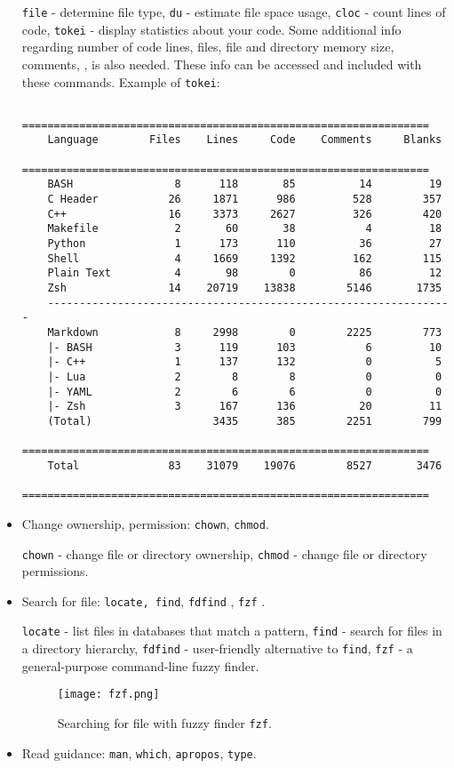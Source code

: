 \begin{itemize}
	\verb|file| - determine file type, \verb|du| - estimate file space usage, \verb|cloc| - count lines of code, \verb|tokei| - display statistics about your code. Some additional info regarding number of code lines, files, file and directory memory size, comments, \etc, is also needed. These info can be accessed and included with these commands. Example of \texttt{tokei}:
	\begin{verbatim}
	================================================================
	Language        Files    Lines     Code    Comments     Blanks
	================================================================
	BASH                8      118       85          14         19
	C Header           26     1871      986         528        357
	C++                16     3373     2627         326        420
	Makefile            2       60       38           4         18
	Python              1      173      110          36         27
	Shell               4     1669     1392         162        115
	Plain Text          4       98        0          86         12
	Zsh                14    20719    13838        5146       1735
	----------------------------------------------------------------
	Markdown            8     2998        0        2225        773
	|- BASH             3      119      103           6         10
	|- C++              1      137      132           0          5
	|- Lua              2        8        8           0          0
	|- YAML             2        6        6           0          0
	|- Zsh              3      167      136          20         11
	(Total)                   3435      385        2251        799
	================================================================
	Total              83    31079    19076        8527       3476
	================================================================
	\end{verbatim}
	
	\item Change ownership, permission: \verb|chown|, \verb|chmod|.
	
	\verb|chown| - change file or directory ownership, \verb|chmod| - change file or directory permissions.
	\item Search for file: \verb|locate, find|, \verb|fdfind| \cite{fdfind}, \verb|fzf| \cite{fzf}.
	
	\verb|locate| - list files in databases that match a pattern, \verb|find| - search for files in a directory hierarchy, \verb|fdfind| - user-friendly alternative to \texttt{find}, \verb|fzf| - a general-purpose command-line fuzzy finder.
	\begin{figure}[hbt!]
		\centering
		\texttt{[image: fzf.png]}
		\caption{Searching for file with fuzzy finder \texttt{fzf}.}
	\end{figure}
	\item Read guidance: \verb|man|, \verb|which|, \verb|apropos|, \verb|type|.
	

\end{itemize}
